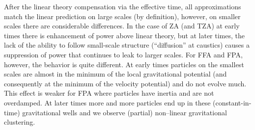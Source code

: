 After the linear theory compensation via the effective time, all approximations match the linear prediction on large scales (by definition), however, on smaller scales there are considerable differences. In the case of ZA (and TZA) at early times there is enhancement of power above linear theory, but at later times, the lack of the ability to follow small-scale structure (``diffusion'' at caustics) causes a suppression of power that continues to leak to larger scales. For FFA and FPA, however, the behavior is quite different. At early times particles on the smallest scales are almost in the minimum of the local gravitational potential (and consequently at the minimum of the velocity potential) and do not evolve much. This effect is weaker for FPA where particles have inertia and are not overdamped. At later times more and more particles end up in these (constant-in-time) gravitational wells and we observe (partial) non--linear gravitational clustering.
